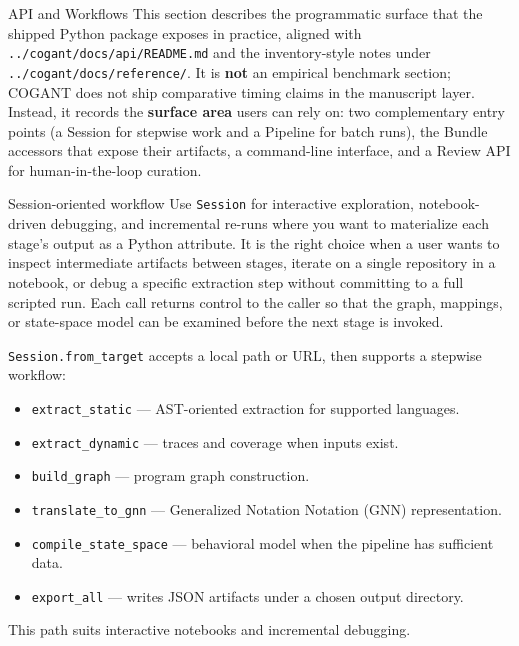 \documentclass[
  ignorenonframetext,
]{beamer}
\author{\texorpdfstring{}{}}
\date{}
\providecommand{\tightlist}{%
  \setlength{\itemsep}{0pt}\setlength{\parskip}{0pt}}
\begin{document}
\begin{frame}[fragile]{API and Workflows}
\protect{}\label{api-and-workflows}
This section describes the programmatic surface that the shipped Python
package exposes in practice, aligned with
\texttt{../cogant/docs/api/README.md} and the inventory-style notes
under \texttt{../cogant/docs/reference/}. It is \textbf{not} an
empirical benchmark section; COGANT does not ship comparative timing
claims in the manuscript layer. Instead, it records the \textbf{surface
area} users can rely on: two complementary entry points (a Session for
stepwise work and a Pipeline for batch runs), the Bundle accessors that
expose their artifacts, a command-line interface, and a Review API for
human-in-the-loop curation.

\begin{block}{Session-oriented workflow}
\protect{}\label{session-oriented-workflow}
Use \texttt{Session} for interactive exploration, notebook-driven
debugging, and incremental re-runs where you want to materialize each
stage's output as a Python attribute. It is the right choice when a user
wants to inspect intermediate artifacts between stages, iterate on a
single repository in a notebook, or debug a specific extraction step
without committing to a full scripted run. Each call returns control to
the caller so that the graph, mappings, or state-space model can be
examined before the next stage is invoked.

\texttt{Session.from\_target} accepts a local path or URL, then supports
a stepwise workflow:

\begin{itemize}
\tightlist
\item
  \texttt{extract\_static} --- AST-oriented extraction for supported
  languages.
\item
  \texttt{extract\_dynamic} --- traces and coverage when inputs exist.
\item
  \texttt{build\_graph} --- program graph construction.
\item
  \texttt{translate\_to\_gnn} --- Generalized Notation Notation (GNN)
  representation.
\item
  \texttt{compile\_state\_space} --- behavioral model when the pipeline
  has sufficient data.
\item
  \texttt{export\_all} --- writes JSON artifacts under a chosen output
  directory.
\end{itemize}

This path suits interactive notebooks and incremental debugging.
\end{block}


\end{frame}
\end{document}

